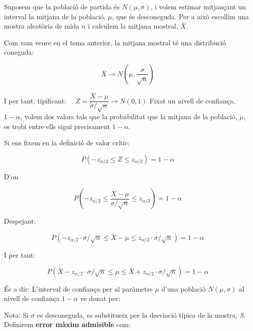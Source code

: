 \documentclass[12pt]{article}
\begin{document}
\begin{concept} [title=Concepte] \noindent
   
Suposem que la població de partida és $N(\mu, \sigma)$, i volem estimar mitjançant un interval la mitjana de la població, $\mu$, que és desconeguda. Per a això escollim una mostra aleatòria de mida $n$ i calculem la mitjana mostral, $\bar{X}$.

Com vam veure en el tema anterior, la mitjana mostral té una distribució coneguda:

$$
\bar{X} \rightarrow N\left(\mu, \frac{\sigma}{\sqrt{n}}\right)
$$

I per tant, tipificant: $\quad Z=\dfrac{\bar{X}-\mu}{\sigma / \sqrt{n}} \rightarrow N(0,1)$
Fixat un nivell de confiança, $1-\alpha$, volem dos valors tals que la probabilitat que la mitjana de la població, $\mu$, es trobi entre ells sigui precisament $1-\alpha$.

Si ens fixem en la definició de valor crític:

$$
P\left(-z_{\alpha / 2} \leq Z \leq z_{\alpha / 2}\right)=1-\alpha
$$

D'on

$$
P\left(-z_{\alpha / 2} \leq \frac{\bar{X}-\mu}{\sigma / \sqrt{n}} \leq z_{\alpha / 2}\right)=1-\alpha
$$

Despejant:

$$
P\left(-z_{\alpha / 2} \cdot \sigma / \sqrt{n} \leq \bar{X}-\mu \leq z_{\alpha / 2} \cdot \sigma / \sqrt{n}\right)=1-\alpha
$$

I per tant:

$$
P\left(\bar{X}-z_{\alpha / 2} \cdot \sigma / \sqrt{n} \leq \mu \leq \bar{X}+z_{\alpha / 2} \cdot \sigma / \sqrt{n}\right)=1-\alpha
$$

És a dir:
L'interval de confiança per al paràmetre $\mu$ d'una població $N(\mu, \sigma)$ al nivell de confiança $1-\alpha$ ve donat per:


\begin{center}
\end{center}


Nota: Si $\sigma$ es desconeguda, es substitueix per la desviació típica de la mostra, \textit{S}.\\

Definirem \textbf{error màxim admisible} com:

\begin{center}
\end{center}
\end{concept}
\end{document}
